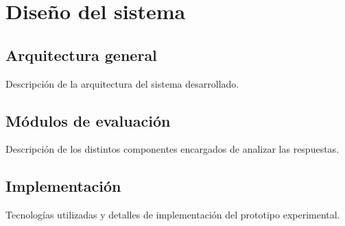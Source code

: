 \chapter{Diseño del sistema}

\section{Arquitectura general}
Descripción de la arquitectura del sistema desarrollado.

\section{Módulos de evaluación}
Descripción de los distintos componentes encargados de analizar las respuestas.

\section{Implementación}
Tecnologías utilizadas y detalles de implementación del prototipo experimental.
